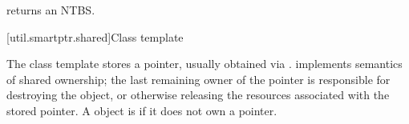 \begin{itemdescr}
\pnum\postconditions  {} returns an
 NTBS.

\end{itemdescr}

[util.smartptr.shared]{Class template }

\pnum
{}%
The  class template stores a pointer, usually obtained
via .  implements semantics of shared ownership;
the last remaining owner of the pointer is responsible for destroying
the object, or otherwise releasing the resources associated with the stored pointer. A
 object is  if it does not own a pointer.

